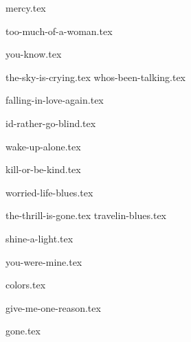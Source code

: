 \begin{songs}{}

  {mercy.tex}
  \sclearpage

  {too-much-of-a-woman.tex}
  \sclearpage

  {you-know.tex}
  \sclearpage

  {the-sky-is-crying.tex}
  {whos-been-talking.tex}

  \sclearpage

  {falling-in-love-again.tex}  
  \sclearpage

  {id-rather-go-blind.tex}  
  \sclearpage
  
  {wake-up-alone.tex}
  \sclearpage
  
  {kill-or-be-kind.tex}
  \sclearpage
  
  {worried-life-blues.tex}
  \sclearpage

  {the-thrill-is-gone.tex}
  {travelin-blues.tex}

  \sclearpage

  {shine-a-light.tex}  
  \sclearpage

  {you-were-mine.tex}
  \sclearpage

  {colors.tex}
  \sclearpage

  {give-me-one-reason.tex}
  \sclearpage

  {gone.tex}
  
 \end{songs}

